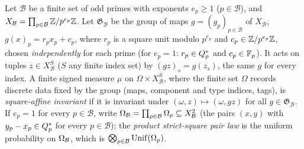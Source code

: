 \begin{definition}\label{def:map:invariance}
Let $\mathcal B$ be a finite set of odd primes with exponents $e_p\ge1$
($p\in\mathcal B$), and $X_{\mathcal B}=\prod_{p\in\mathcal B}\Z/p^{e_p}\Z$. Let
$\mathfrak G_{\mathcal B}$ be the group of maps $g=(g_p)_{p\in\mathcal B}$ of
$X_{\mathcal B}$, $g(x)_p=r_px_p+c_p$, where $r_p$ is a square unit modulo
$p^{e_p}$ and $c_p\in\Z/p^{e_p}\Z$, chosen \emph{independently} for each prime
(for $e_p=1$: $r_p\in\Qsq$ and $c_p\in\Fp$). It acts on tuples
$z\in X_{\mathcal B}^S$ ($S$ any finite index set) by $(gz)_s=g(z_s)$, the same
$g$ for every index. A finite signed measure $\mu$ on $\Omega\times X_{\mathcal B}^S$,
where the finite set $\Omega$ records discrete data fixed by the group (maps,
component and type indices, tags), is \emph{square-affine invariant} if it is
invariant under $(\omega,z)\mapsto(\omega,gz)$ for all $g\in\mathfrak G_{\mathcal B}$.
If $e_p=1$ for every $p\in\mathcal B$, write
$\Om[\mathcal B]=\prod_{p\in\mathcal B}\Om\subseteq X_{\mathcal B}^2$ (the pairs
$(x,y)$ with $y_p-x_p\in\Qsq$ for every $p\in\mathcal B$); the \emph{product
strict-square pair law} is the uniform probability on $\Om[\mathcal B]$, which
is $\bigotimes_{p\in\mathcal B}\Unif(\Om)$.
\end{definition}

